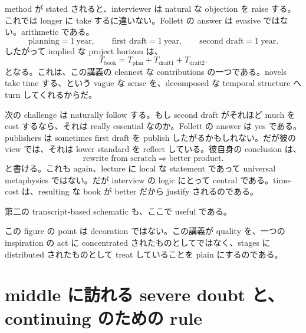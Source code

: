 method が stated されると、interviewer は natural な objection を raise する。これでは longer に take するに違いない。Follett の answer は evasive ではない。arithmetic である。
\begin{equation}
\text{planning} = 1\ \text{year}, \qquad
\text{first draft} = 1\ \text{year}, \qquad
\text{second draft} = 1\ \text{year}.
\end{equation}
したがって implied な project horizon は、
\begin{equation}
T_{\text{book}} = T_{\text{plan}} + T_{\text{draft1}} + T_{\text{draft2}}.
\end{equation}
となる。これは、この講義の cleanest な contributions の一つである。novels take time する、という vague な sense を、decomposed な temporal structure へ turn してくれるからだ。

次の challenge は naturally follow する。もし second draft がそれほど much を cost するなら、それは really essential なのか。Follett の answer は yes である。publishers は sometimes first draft を publish したがるかもしれない。だが彼の view では、それは lower standard を reflect している。彼自身の conclusion は、
\begin{equation}
\text{rewrite from scratch} \Rightarrow \text{better product}.
\end{equation}
と書ける。これも again、lecture に local な statement であって universal metaphysics ではない。だが interview の logic にとって central である。time-cost は、resulting な book が better だから justify されるのである。

第二の transcript-based schematic も、ここで useful である。

\begin{figure}[h]
\centering
{}
\end{figure}

この figure の point は decoration ではない。この講義が quality を、一つの inspiration の act に concentrated されたものとしてではなく、stages に distributed されたものとして treat していることを plain にするのである。

\section{middle に訪れる severe doubt と、continuing のための rule}

